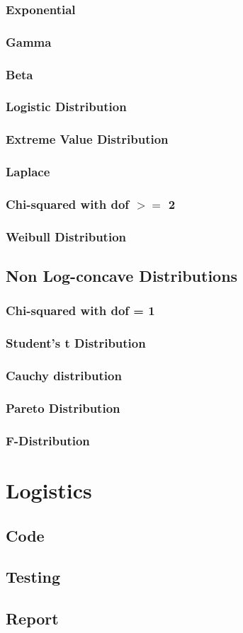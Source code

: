 \documentclass{article}\usepackage[]{graphicx}\usepackage[]{color}
\begin{document}
\subsubsection{Exponential}
\subsubsection{Gamma}
\subsubsection{Beta}
\subsubsection{Logistic Distribution}
\subsubsection{Extreme Value Distribution}
\subsubsection{Laplace}
\subsubsection{Chi-squared with dof $>=$ 2}
\subsubsection{Weibull Distribution}


\subsection{Non Log-concave Distributions}
\subsubsection{Chi-squared with dof = 1}
\subsubsection{Student's t Distribution}
\subsubsection{Cauchy distribution}
\subsubsection{Pareto Distribution}
\subsubsection{F-Distribution}


\section{Logistics}
\subsection{Code}
\subsection{Testing}
\subsection{Report}
\end{document}
